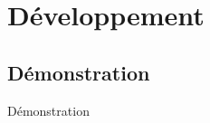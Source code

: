 \section{Développement}

\subsection{Démonstration}

\begin{frame}[c]{\insertsubsection{}}
    \begin{center}
    	\huge{Démonstration} 
     \end{center}
\end{frame}



